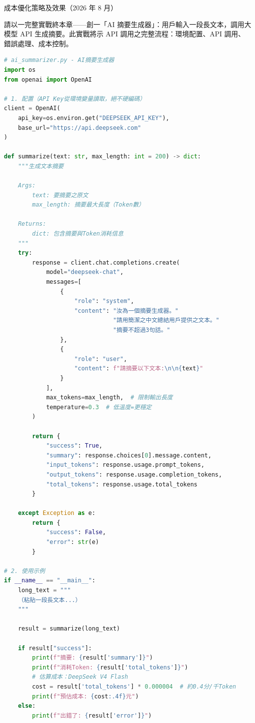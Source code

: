 \begin{center}\small\color{gray}成本優化策略及效果（2026 年 8 月）\end{center}


請以一完整實戰終本章——創一「AI 摘要生成器」：用戶輸入一段長文本，調用大模型 API 生成摘要。此實戰將示 API 調用之完整流程：環境配置、API 調用、錯誤處理、成本控制。

\begin{lstlisting}[language=Python]
# ai_summarizer.py - AI摘要生成器
import os
from openai import OpenAI

# 1. 配置（API Key從環境變量讀取，絕不硬編碼）
client = OpenAI(
    api_key=os.environ.get("DEEPSEEK_API_KEY"),
    base_url="https://api.deepseek.com"
)

def summarize(text: str, max_length: int = 200) -> dict:
    """生成文本摘要

    Args:
        text: 要摘要之原文
        max_length: 摘要最大長度（Token數）

    Returns:
        dict: 包含摘要與Token消耗信息
    """
    try:
        response = client.chat.completions.create(
            model="deepseek-chat",
            messages=[
                {
                    "role": "system",
                    "content": "汝為一個摘要生成器。"
                               "請用簡潔之中文總結用戶提供之文本。"
                               "摘要不超過3句話。"
                },
                {
                    "role": "user",
                    "content": f"請摘要以下文本:\n\n{text}"
                }
            ],
            max_tokens=max_length,  # 限制輸出長度
            temperature=0.3  # 低溫度=更穩定
        )

        return {
            "success": True,
            "summary": response.choices[0].message.content,
            "input_tokens": response.usage.prompt_tokens,
            "output_tokens": response.usage.completion_tokens,
            "total_tokens": response.usage.total_tokens
        }

    except Exception as e:
        return {
            "success": False,
            "error": str(e)
        }

# 2. 使用示例
if __name__ == "__main__":
    long_text = """
    （粘貼一段長文本...）
    """

    result = summarize(long_text)

    if result["success"]:
        print(f"摘要: {result['summary']}")
        print(f"消耗Token: {result['total_tokens']}")
        # 估算成本：DeepSeek V4 Flash
        cost = result['total_tokens'] * 0.000004  # 約0.4分/千Token
        print(f"預估成本: {cost:.4f}元")
    else:
        print(f"出錯了: {result['error']}")
\end{lstlisting}

